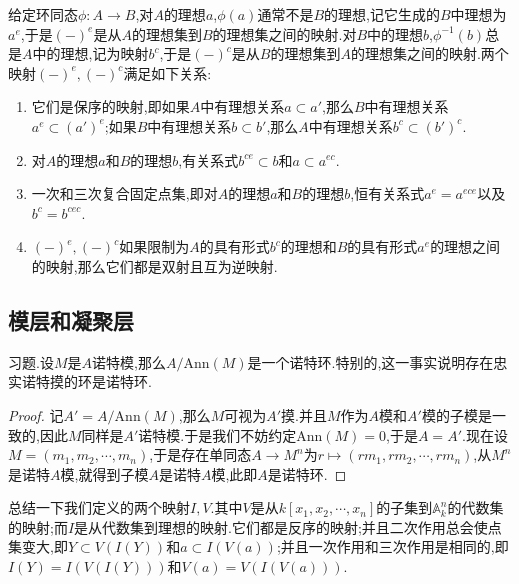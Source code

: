 给定环同态$\phi:A\to B$,对$A$的理想$a$,$\phi(a)$通常不是$B$的理想,记它生成的$B$中理想为$a^e$,于是$(-)^e$是从$A$的理想集到$B$的理想集之间的映射.对$B$中的理想$b$,$\phi^{-1}(b)$总是$A$中的理想,记为映射$b^c$,于是$(-)^c$是从$B$的理想集到$A$的理想集之间的映射.两个映射$(-)^e,(-)^c$满足如下关系:
\begin{enumerate}
	\item 它们是保序的映射,即如果$A$中有理想关系$a\subset a'$,那么$B$中有理想关系$a^e\subset(a')^e$;如果$B$中有理想关系$b\subset b'$,那么$A$中有理想关系$b^c\subset(b')^c$.
	\item 对$A$的理想$a$和$B$的理想$b$,有关系式$b^{ce}\subset b$和$a\subset a^{ec}$.
	\item 一次和三次复合固定点集,即对$A$的理想$a$和$B$的理想$b$,恒有关系式$a^e=a^{ece}$以及$b^c=b^{cec}$.
	\item $(-)^e,(-)^c$如果限制为$A$的具有形式$b^c$的理想和$B$的具有形式$a^e$的理想之间的映射,那么它们都是双射且互为逆映射.
\end{enumerate}

\subsection{模层和凝聚层}







习题.设$M$是$A$诺特模,那么$A/\mathrm{Ann}(M)$是一个诺特环.特别的,这一事实说明存在忠实诺特摸的环是诺特环.
\begin{proof}
	
	记$A'=A/\mathrm{Ann}(M)$,那么$M$可视为$A'$摸.并且$M$作为$A$模和$A'$模的子模是一致的,因此$M$同样是$A'$诺特模.于是我们不妨约定$\mathrm{Ann}(M)=0$,于是$A=A'$.现在设$M=(m_1,m_2,\cdots,m_n)$,于是存在单同态$A\to M^n$为$r\mapsto(rm_1,rm_2,\cdots,rm_n)$,从$M^n$是诺特$A$模,就得到子模$A$是诺特$A$模,此即$A$是诺特环.
\end{proof}





















总结一下我们定义的两个映射$I,V$.其中$V$是从$k[x_1,x_2,\cdots,x_n]$的子集到$\mathbb{A}_k^n$的代数集的映射;而$I$是从代数集到理想的映射.它们都是反序的映射;并且二次作用总会使点集变大,即$Y\subset V(I(Y))$和$a\subset I(V(a))$;并且一次作用和三次作用是相同的,即$I(Y)=I(V(I(Y)))$和$V(a)=V(I(V(a)))$.

